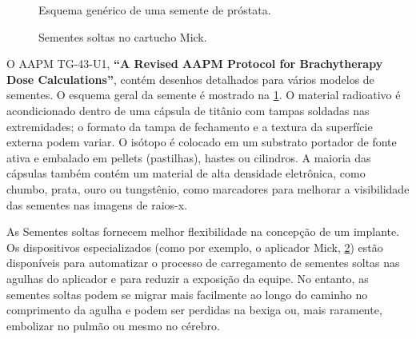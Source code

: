 \documentclass[11pt,a4paper]{article}
\newcounter{exemplo}
\begin{document}
	\begin{figure}[h]
		\centering
		\caption{Esquema genérico de uma semente de próstata.}
		\label{fig:esquemaSementeProstata}
	\end{figure}

	\begin{figure}[h]
		\centering
		\caption{Sementes soltas no cartucho Mick.}
		\label{fig:sementesSoltasMick}
	\end{figure}

	O AAPM TG-43-U1, \textbf{``A Revised AAPM Protocol for Brachytherapy Dose Calculations''}, contém desenhos detalhados para vários modelos de sementes. O esquema geral da semente é mostrado na \ref{fig:esquemaSementeProstata}. O material radioativo é acondicionado dentro de uma cápsula de titânio com tampas soldadas nas extremidades; o formato da tampa de fechamento e a textura da superfície externa podem variar. O isótopo é colocado em um substrato portador de fonte ativa e embalado em pellets (pastilhas), hastes ou cilindros. A maioria das cápsulas também contém um material de alta densidade eletrônica, como chumbo, prata, ouro ou tungstênio, como marcadores para melhorar a visibilidade das sementes nas imagens de raios-x.

	As Sementes soltas fornecem melhor flexibilidade na concepção de um implante. Os dispositivos especializados (como por exemplo, o aplicador Mick, \ref{fig:sementesSoltasMick}) estão disponíveis para automatizar o processo de carregamento de sementes soltas nas agulhas do aplicador e para reduzir a exposição da equipe. No entanto, as sementes soltas podem se migrar mais facilmente ao longo do caminho no comprimento da agulha e podem ser perdidas na bexiga ou, mais raramente, embolizar no pulmão ou mesmo no cérebro.
\end{document}
